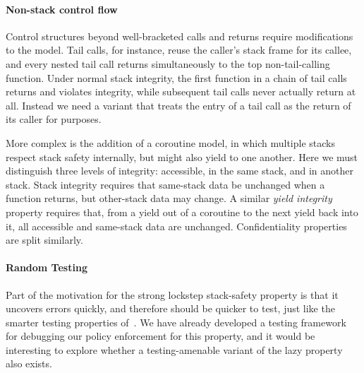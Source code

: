 \documentclass[acmsmall,review,anonymous]{acmart}\settopmatter{printfolios=true,printccs=false,printacmref=false}
\begin{document}
{{  \paragraph{Non-stack control flow}

    Control structures beyond well-bracketed calls and returns require
    modifications to the model. Tail calls, for instance, reuse the caller's
    stack frame for its callee, and every nested tail call returns
    simultaneously to the top non-tail-calling function. Under normal stack
    integrity, the first function in a chain of tail calls returns and violates
    integrity, while subsequent tail calls never actually return at all.
    Instead we need a variant that treats the entry of a tail call as the
    return of its caller for purposes.

    More complex is the addition of a coroutine model, in which multiple stacks
    respect stack safety internally, but might also yield to one another.
    Here we must distinguish three levels of integrity: accessible, in the same
    stack, and in another stack. Stack integrity requires that same-stack data
    be unchanged when a function returns, but other-stack data may change. A
    similar {\em yield integrity} property requires that, from a yield out of
    a coroutine to the next yield back into it, all accessible and same-stack
    data are unchanged. Confidentiality properties are split similarly.

  \paragraph{Random Testing}

  Part of the motivation for the strong lockstep stack-safety property
  is that it uncovers errors quickly, and therefore should be quicker
  to test, just like the smarter testing properties
  of~\citet{TestingNI:ICFP}. We have already developed a testing
  framework for debugging our policy enforcement for this property, and
  it would be interesting to explore whether a testing-amenable variant
  of the lazy property also exists.

}}
\end{document}
